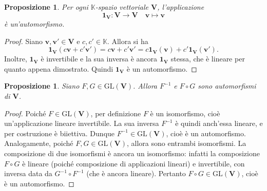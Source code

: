 \documentclass{article}
\theoremstyle{plain}
\newtheorem{prop}[thm]{Proposizione}
\theoremstyle{definition}
\theoremstyle{remark}
\begin{document}
\vspace{10pt}

\begin{bxthm}
\begin{prop}
    Per ogni $\mathbb{K}$-spazio vettoriale $\mathbf{V}$, l'applicazione
    \[ \mathbf{1}_\mathbf{V}:\mathbf{V}\to \mathbf{V}\quad\mathbf{v}\mapsto\mathbf{v} \]
    è un'automorfismo.
\end{prop}
\end{bxthm}
\begin{proof}
    Siano $\mathbf{v}, \mathbf{v}' \in \mathbf{V}$ e $c,c' \in \mathbb{K}$. Allora si ha
    \[
        \mathbf{1}_\mathbf{V}(c\mathbf{v} + c'\mathbf{v}') = c\mathbf{v} + c'\mathbf{v}' = c\mathbf{1}_\mathbf{V}(\mathbf{v}) + c'\mathbf{1}_\mathbf{V}(\mathbf{v}').
    \]    
    Inoltre, $\mathbf{1}_\mathbf{V}$ è invertibile e la sua inversa è ancora $\mathbf{1}_\mathbf{V}$ stessa, che è lineare per quanto appena dimostrato. Quindi $\mathbf{1}_\mathbf{V}$ è un automorfismo.
\end{proof}

\vspace{10pt}

\begin{bxthm}
\begin{prop}
    Siano $F,G\in\mathrm{GL}(\mathbf{V})$. Allora $F^{-1}$ e $F\circ G$ sono automorfismi di $\mathbf{V}$.
\end{prop}
\end{bxthm}
\begin{proof}
    Poiché $F \in \mathrm{GL}(\mathbf{V})$, per definizione $F$ è un isomorfismo, cioè un'applicazione lineare invertibile. La sua inversa $F^{-1}$ è quindi anch'essa lineare, e per costruzione è biiettiva. Dunque $F^{-1} \in \mathrm{GL}(\mathbf{V})$, cioè è un automorfismo.
    Analogamente, poiché $F, G \in \mathrm{GL}(\mathbf{V})$, allora sono entrambi isomorfismi. La composizione di due isomorfismi è ancora un isomorfismo: infatti la composizione $F \circ G$ è lineare (poiché composizione di applicazioni lineari) e invertibile, con inversa data da $G^{-1} \circ F^{-1}$ (che è ancora lineare). Pertanto $F \circ G \in \mathrm{GL}(\mathbf{V})$, cioè è un automorfismo.
\end{proof}

\vspace{10pt}
\end{document}
